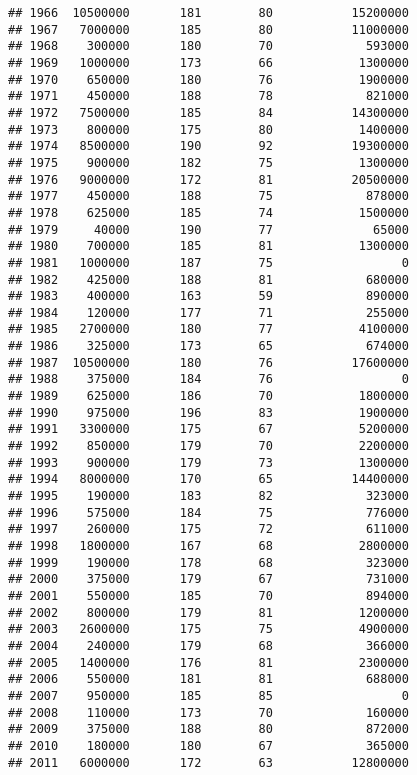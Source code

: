 \documentclass[
]{article}
\begin{document}
\begin{verbatim}
## 1966  10500000       181        80           15200000
## 1967   7000000       185        80           11000000
## 1968    300000       180        70             593000
## 1969   1000000       173        66            1300000
## 1970    650000       180        76            1900000
## 1971    450000       188        78             821000
## 1972   7500000       185        84           14300000
## 1973    800000       175        80            1400000
## 1974   8500000       190        92           19300000
## 1975    900000       182        75            1300000
## 1976   9000000       172        81           20500000
## 1977    450000       188        75             878000
## 1978    625000       185        74            1500000
## 1979     40000       190        77              65000
## 1980    700000       185        81            1300000
## 1981   1000000       187        75                  0
## 1982    425000       188        81             680000
## 1983    400000       163        59             890000
## 1984    120000       177        71             255000
## 1985   2700000       180        77            4100000
## 1986    325000       173        65             674000
## 1987  10500000       180        76           17600000
## 1988    375000       184        76                  0
## 1989    625000       186        70            1800000
## 1990    975000       196        83            1900000
## 1991   3300000       175        67            5200000
## 1992    850000       179        70            2200000
## 1993    900000       179        73            1300000
## 1994   8000000       170        65           14400000
## 1995    190000       183        82             323000
## 1996    575000       184        75             776000
## 1997    260000       175        72             611000
## 1998   1800000       167        68            2800000
## 1999    190000       178        68             323000
## 2000    375000       179        67             731000
## 2001    550000       185        70             894000
## 2002    800000       179        81            1200000
## 2003   2600000       175        75            4900000
## 2004    240000       179        68             366000
## 2005   1400000       176        81            2300000
## 2006    550000       181        81             688000
## 2007    950000       185        85                  0
## 2008    110000       173        70             160000
## 2009    375000       188        80             872000
## 2010    180000       180        67             365000
## 2011   6000000       172        63           12800000

\end{verbatim}
\end{document}
